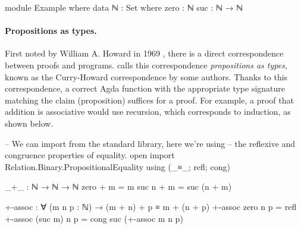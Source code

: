 \documentclass[logo,bsc,singlespacing,parskip,online]{infthesis}
\renewenvironment{code}{\mintedcopy[breaklines,breaksymbolleft=\;]{agda}}{\endmintedcopy}
\begin{document}
\begin{code}
module Example where
  data ℕ : Set where
    zero : ℕ
    suc  : ℕ → ℕ
\end{code}


\paragraph*{Propositions as types.} First noted by William A. Howard in 1969
\citep{howard_formulae-as-types_1980}, there is a direct correspondence between proofs and programs.
\citet{wadler_propositions_2015} calls this correspondence \textit{propositions as types}, known as
the Curry-Howard correspondence by some authors. Thanks to this correspondence, a correct Agda
function with the appropriate type signature matching the claim (proposition) suffices for a proof.
For example, a proof that addition is associative would use recursion, which corresponds to
induction, as shown below.

\begin{code}
  -- We can import from the standard library, here we're using
  -- the reflexive and congruence properties of equality.
  open import Relation.Binary.PropositionalEquality
    using (_≡_; refl; cong)

  _+_ : ℕ → ℕ → ℕ
  zero  + m = m
  suc n + m = suc (n + m)

  +-assoc : ∀ (m n p : ℕ) → (m + n) + p ≡ m + (n + p)
  +-assoc zero    n p = refl
  +-assoc (suc m) n p = cong suc (+-assoc m n p)
\end{code}
\end{document}

